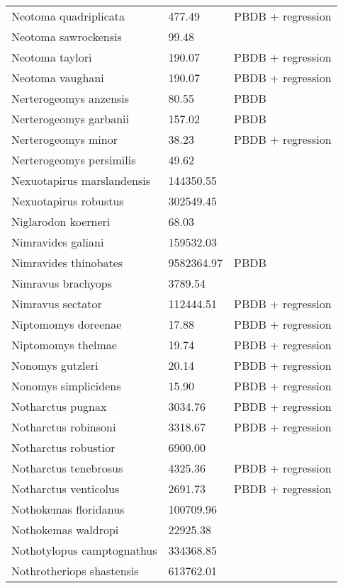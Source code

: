 \begin{center}
\begin{longtable}{p{} p{} p{} }
  Neotoma quadriplicata & 477.49 & PBDB + regression \\ 
  Neotoma sawrockensis & 99.48 & \cite{Tomiya2013} \\ 
  Neotoma taylori & 190.07 & PBDB + regression \\ 
  Neotoma vaughani & 190.07 & PBDB + regression \\ 
  Nerterogeomys anzensis & 80.55 & PBDB \\ 
  Nerterogeomys garbanii & 157.02 & PBDB \\ 
  Nerterogeomys minor & 38.23 & PBDB + regression \\ 
  Nerterogeomys persimilis & 49.62 & \cite{Grohe2010} \\ 
  Nexuotapirus marslandensis & 144350.55 & \cite{Tomiya2013} \\ 
  Nexuotapirus robustus & 302549.45 & \cite{Tomiya2013} \\ 
  Niglarodon koerneri & 68.03 & \cite{Tomiya2013} \\ 
  Nimravides galiani & 159532.03 & \cite{Tomiya2013} \\ 
  Nimravides thinobates & 9582364.97 & PBDB \\ 
  Nimravus brachyops & 3789.54 & \cite{Tomiya2013} \\ 
  Nimravus sectator & 112444.51 & PBDB + regression \\ 
  Niptomomys doreenae & 17.88 & PBDB + regression \\ 
  Niptomomys thelmae & 19.74 & PBDB + regression \\ 
  Nonomys gutzleri & 20.14 & PBDB + regression \\ 
  Nonomys simplicidens & 15.90 & PBDB + regression \\ 
  Notharctus pugnax & 3034.76 & PBDB + regression \\ 
  Notharctus robinsoni & 3318.67 & PBDB + regression \\ 
  Notharctus robustior & 6900.00 & \cite{Soligo2006} \\ 
  Notharctus tenebrosus & 4325.36 & PBDB + regression \\ 
  Notharctus venticolus & 2691.73 & PBDB + regression \\ 
  Nothokemas floridanus & 100709.96 & \cite{Tomiya2013} \\ 
  Nothokemas waldropi & 22925.38 & \cite{Tomiya2013} \\ 
  Nothotylopus camptognathus & 334368.85 & \cite{Tomiya2013} \\ 
  Nothrotheriops shastensis & 613762.01 & \cite{Brook2004a} \\ 

\end{longtable}
\end{center}
